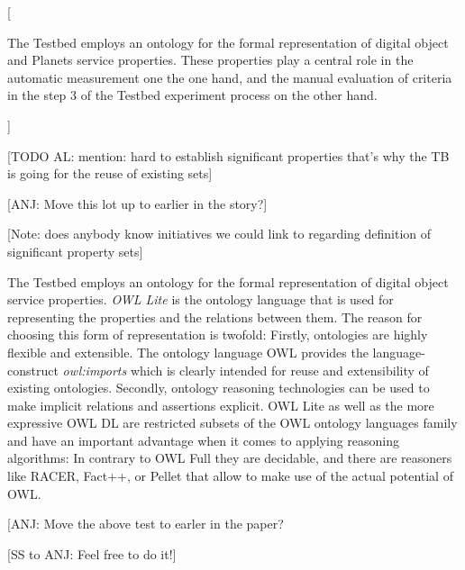 \documentclass{article}
\begin{document}
[

The Testbed employs an ontology for the formal representation of digital object
and Planets service properties. These properties play a central role in the
automatic measurement one the one hand, and the manual evaluation of criteria in
the step 3 of the Testbed experiment process on the other hand.

]

[TODO AL: mention: hard to establish significant properties that's why the TB is
going for the reuse of existing sets]

[ANJ: Move this lot up to earlier in the story?]

[Note: does anybody know initiatives we could link to regarding definition of
significant property sets]

The Testbed employs an ontology for the formal representation of digital object
service properties. \emph{OWL Lite} \cite{w3c-owl-ref} is the ontology language
that is used for representing the properties and the relations between them. The
reason for choosing this form of representation is twofold: Firstly, ontologies
are highly flexible and extensible. The ontology language OWL provides the
language-construct \emph{owl:imports} which is clearly intended for reuse and
extensibility of existing ontologies. Secondly, ontology reasoning technologies
can be used to make implicit relations and assertions explicit. OWL Lite as well
as the more expressive OWL DL are restricted subsets of the OWL ontology
languages family and have an important advantage when it comes to applying
reasoning algorithms: In contrary to OWL Full they are decidable, and there are
reasoners like RACER, Fact++, or Pellet \cite{huangliyang2008} that allow to make
use of the actual potential of OWL.

[ANJ: Move the above test to earler in the paper?

[SS to ANJ: Feel free to do it!]
\end{document}
